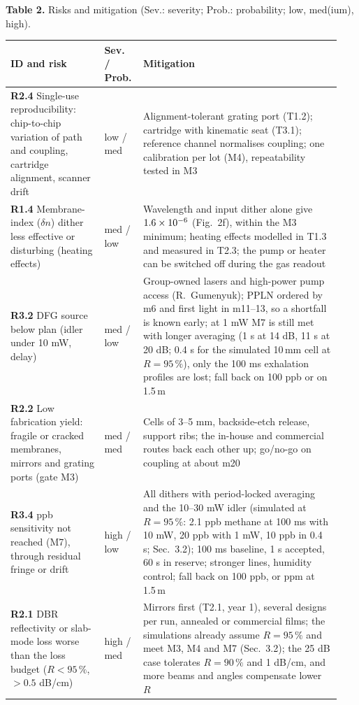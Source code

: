 \documentclass[a4paper,12pt]{article}
\newcommand{\wc}[1]{\textcolor{dkmaroon}{#1}} %
\newcommand{\jc}[1]{\textcolor{dkrust}{#1}} %
\renewcommand{\times}{\mathbin{\text{\texttimes}}}%
\begin{document}
\begin{table}[!t]
\raggedright\small\textbf{Table 2.} Risks and mitigation (Sev.: severity; Prob.: probability; low, med(ium), high).
\centering
\fontsize{10}{11.4}\selectfont
\renewcommand{\arraystretch}{1.0}
\setlength{\tabcolsep}{3pt}
\begin{tabular}{|>{\raggedright\arraybackslash}p{0.2700\linewidth}|>{\raggedright\arraybackslash}p{0.1000\linewidth}|>{\raggedright\arraybackslash}p{0.5750\linewidth}|}
\hline
\rowcolor{gray!25}\textbf{ID and risk} & \textbf{Sev. / Prob.} & \textbf{Mitigation} \\ \hline
\textbf{R2.4} Single-use reproducibility: chip-to-chip variation of path and coupling, cartridge alignment, scanner drift & low / med & \jc{Alignment-tolerant grating port (T1.2); cartridge with kinematic seat (T3.1); reference channel normalises coupling; one calibration per lot (M4), repeatability tested in M3} \\ \hline
\textbf{R1.4} Membrane-index ($\delta n$) dither less effective or disturbing (heating effects) & med / low & \jc{Wavelength and input dither alone give $1.6\times10^{-6}$ (Fig.~2f), within the M3 minimum; heating effects modelled in T1.3 and measured in T2.3; the pump or heater can be switched off during the gas readout} \\ \hline
\textbf{R3.2} DFG source below plan (idler under 10 mW, delay) & med / low & \jc{Group-owned lasers and high-power pump access (R.~Gumenyuk); PPLN ordered by m6 and first light in m11--13, so a shortfall is known early; at 1 mW M7 is still met with longer averaging (1 s at 14 dB, 11 s at 20 dB\wc{; 0.4 s for the simulated 10\,mm cell at $R=95\,\%$}), only the 100 ms exhalation profiles are lost; fall back on 100 ppb or on 1.5\,\textmu{}m} \\ \hline
\textbf{R2.2} Low fabrication yield: fragile or cracked membranes, mirrors and grating ports (gate M3) & med / med & \jc{Cells of 3--5 mm, backside-etch release, support ribs; the in-house and commercial routes back each other up; go/no-go on coupling at about m20} \\ \hline
\textbf{R3.4} ppb sensitivity not reached (M7), through residual fringe or drift & high / low & \jc{All dithers with period-locked averaging and the 10--30 mW idler (simulated \wc{at $R=95\,\%$: 2.1} ppb methane at 100 ms with 10 mW, \wc{20} ppb with 1 mW\wc{, 10 ppb in 0.4 s}; Sec.~3.2); 100 ms baseline, 1 s accepted, 60 s in reserve; stronger lines, humidity control; fall back on 100 ppb, or ppm at 1.5\,\textmu{}m} \\ \hline
\textbf{R2.1} DBR reflectivity or slab-mode loss worse than the loss budget ($R<95\,\%$, $>0.5$ dB/cm) & high / med & \jc{Mirrors first (T2.1, year 1), several designs per run, annealed or commercial films; \wc{the simulations already assume $R=95\,\%$ and meet M3, M4 and M7 (Sec.~3.2);} the 25 dB case tolerates $R=90\,\%$ and 1 dB/cm, and more beams and angles compensate lower $R$} \\ \hline
\end{tabular}
\end{table}
\end{document}
